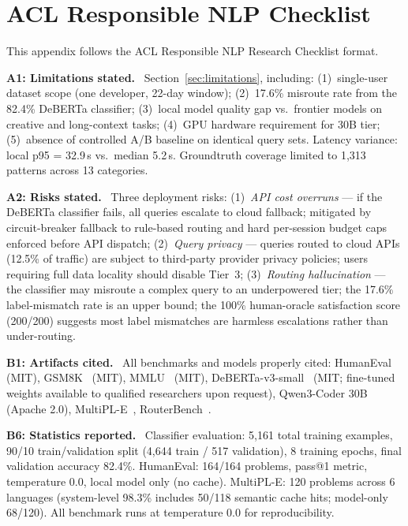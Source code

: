 \documentclass[11pt]{article}
\begin{document}
\section{ACL Responsible NLP Checklist}

This appendix follows the ACL Responsible NLP Research Checklist format.

\textbf{A1: Limitations stated.} \checkmark~Section~\ref{sec:limitations},
including: (1)~single-user dataset scope (one developer, 22-day window);
(2)~17.6\% misroute rate from the 82.4\% DeBERTa classifier; (3)~local
model quality gap vs.\ frontier models on creative and long-context tasks;
(4)~GPU hardware requirement for 30B tier; (5)~absence of controlled A/B
baseline on identical query sets. Latency variance: local p95 = 32.9\,s
vs.\ median 5.2\,s. Groundtruth coverage limited to 1,313 patterns across
13 categories.

\textbf{A2: Risks stated.} \checkmark~Three deployment risks:
(1)~\textit{API cost overruns} --- if the DeBERTa classifier fails, all
queries escalate to cloud fallback; mitigated by circuit-breaker fallback
to rule-based routing and hard per-session budget caps enforced before API
dispatch;
(2)~\textit{Query privacy} --- queries routed to cloud APIs (12.5\% of
traffic) are subject to third-party provider privacy policies; users
requiring full data locality should disable Tier~3;
(3)~\textit{Routing hallucination} --- the classifier may misroute a
complex query to an underpowered tier; the 17.6\% label-mismatch rate is
an upper bound; the 100\% human-oracle satisfaction score (200/200) suggests
most label mismatches are harmless escalations rather than under-routing.

\textbf{B1: Artifacts cited.} \checkmark~All benchmarks and models
properly cited: HumanEval~\cite{chen2021humaneval} (MIT),
GSM8K~\cite{cobbe2021gsm8k} (MIT),
MMLU~\cite{hendrycks2021mmlu} (MIT),
DeBERTa-v3-small~\cite{he2021debertav3} (MIT; fine-tuned weights
available to qualified researchers upon request),
Qwen3-Coder 30B~\cite{qwen2025qwen3} (Apache 2.0),
MultiPL-E~\cite{cassano2022multipl},
RouterBench~\cite{withmartian2024routerbench}.

\textbf{B6: Statistics reported.} \checkmark~Classifier evaluation:
5,161 total training examples, 90/10 train/validation split (4,644
train / 517 validation), 8 training epochs, final validation accuracy
82.4\%. HumanEval: 164/164 problems, pass@1 metric, temperature 0.0,
local model only (no cache). MultiPL-E: 120 problems across 6 languages
(system-level 98.3\% includes 50/118 semantic cache hits; model-only
68/120). All benchmark runs at temperature 0.0 for reproducibility.
\end{document}
